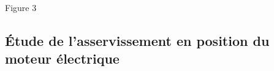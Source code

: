 \documentclass[10pt,fleqn]{article} %
\begin{document}
\begin{multicols}{2}
\begin{center}

Figure 3
\end{center}

\subsection*{\'Etude de l'asservissement en position du moteur électrique}
%
%


\end{multicols}
\end{document}
